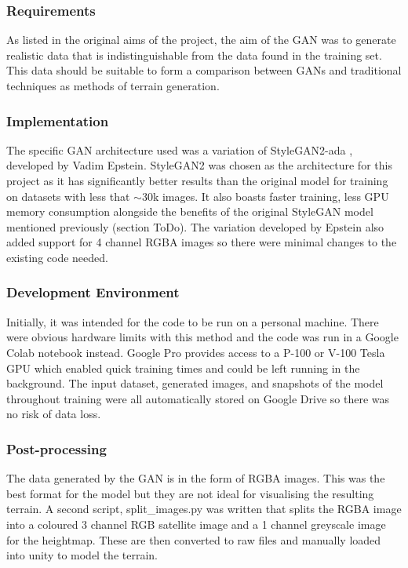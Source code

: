 \documentclass[a4paper]{report}
\begin{document}
\subsubsection{Requirements}
As listed in the original aims of the project, the aim of the GAN was to generate realistic data that is indistinguishable from the data found in the training set. This data should be suitable to form a comparison between GANs and traditional techniques as methods of terrain generation.

\subsubsection{Implementation}
The specific GAN architecture used was a variation of StyleGAN2-ada \cite{ToDo}, developed by Vadim Epstein. StyleGAN2 was chosen as the architecture for this project as it has significantly better results than the original model for training on datasets with less that $\sim$30k images. It also boasts faster training, less GPU memory consumption alongside the benefits of the original StyleGAN model mentioned previously (section ToDo). The variation developed by Epstein also added support for 4 channel RGBA images so there were minimal changes to the existing code needed.

\subsubsection{Development Environment}
Initially, it was intended for the code to be run on a personal machine. There were obvious hardware limits with this method and the code was run in a Google Colab notebook instead. Google Pro provides access to a P-100 or V-100 Tesla GPU which enabled quick training times and could be left running in the background. The input dataset, generated images, and snapshots of the model throughout training were all automatically stored on Google Drive so there was no risk of data loss.

\subsubsection{Post-processing}
The data generated by the GAN is in the form of RGBA images. This was the best format for the model but they are not ideal for visualising the resulting terrain. A second script, split\_images.py was written that splits the RGBA image into a coloured 3 channel RGB satellite image and a 1 channel greyscale image for the heightmap. These are then converted to raw files and manually loaded into unity to model the terrain.
\end{document}
